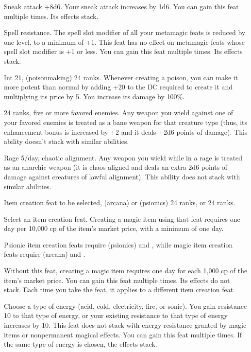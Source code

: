 {}
{Sneak attack +8d6.}
{Your sneak attack increases by 1d6.}
{}{You can gain this feat multiple times. Its effects stack.}

{}
{Spell resistance.}
{The spell slot modifier of all your metamagic feats is reduced by one level, to a minimum of +1. This feat has no effect on metamagic feats whose spell slot modifier is +1 or less.}
{}{You can gain this feat multiple times. Its effects stack.}

{Int 21,  (poisonmaking) 24 ranks.}
{Whenever creating a poison, you can make it more potent than normal by adding +20 to the DC required to create it and multiplying its price by 5. You increase its damage by 100\%.}

{ 24 ranks, five or more favored enemies.}
{Any weapon you wield against one of your favored enemies is treated as a bane weapon for that creature type (thus, its enhancement bonus is increased by +2 and it deals +2d6 points of damage). This ability doesn't stack with similar abilities.}

{Rage 5/day, chaotic alignment.}
{Any weapon you wield while in a rage is treated as an anarchic weapon (it is chaos-aligned and deals an extra 2d6 points of damage against creatures of lawful alignment). This ability does not stack with similar abilities.}

{}
{
Item creation feat to be selected,  (arcana) or  (psionics) 24 ranks,  or  24 ranks.}
{Select an item creation feat. Creating a magic item using that feat requires one day per 10,000 cp of the item's market price, with a minimum of one day.

Psionic item creation feats require  (psionics) and , while magic item creation feats require  (arcana) and .
}
{Without this feat, creating a magic item requires one day for each 1,000 cp of the item's market price.}
{You can gain this feat multiple times. Its effects do not stack. Each time you take the feat, it applies to a different item creation feat.}

{}{}
{Choose a type of energy (acid, cold, electricity, fire, or sonic). You gain resistance 10 to that type of energy, or your existing resistance to that type of energy increases by 10. This feat does not stack with energy resistance granted by magic items or nonpermanent magical effects.}
{}{You can gain this feat multiple times. If the same type of energy is chosen, the effects stack.}

